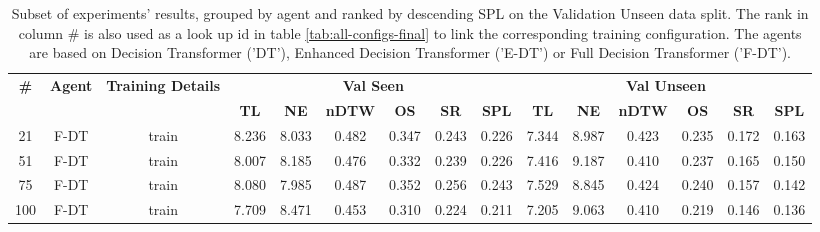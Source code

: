 \begin{table}
\centering
\caption{\label{tab:instruction_encoding_full}Subset of experiments' results, grouped by agent and ranked by descending SPL on the Validation Unseen data split. The rank in column \# is also used as a look up id in table \ref{tab:all-configs-final} to link the corresponding training configuration.     \newline The agents are based on Decision Transformer ('DT'), Enhanced Decision Transformer ('E-DT') or Full Decision Transformer ('F-DT').}
\begin{tabular}{@{\hskip3pt}c@{\hskip3pt}c@{\hskip3pt}c@{\hskip3pt}c@{\hskip3pt}c@{\hskip3pt}c@{\hskip3pt}c@{\hskip3pt}c@{\hskip3pt}c@{\hskip3pt}c@{\hskip3pt}c@{\hskip3pt}c@{\hskip3pt}c@{\hskip3pt}c@{\hskip3pt}c}
\toprule
\textbf{\#} & \textbf{Agent} & \textbf{Training Details} & \multicolumn{6}{c}{\textbf{Val Seen}} & \multicolumn{6}{c}{\textbf{Val Unseen}} \\
\cmidrule(l){4-9} \cmidrule(l){10-15} \textbf{~} &     \textbf{~} &                \textbf{~} &       \textbf{TL} & \textbf{NE} & \textbf{nDTW} & \textbf{OS} & \textbf{SR} & \textbf{SPL} &         \textbf{TL} & \textbf{NE} & \textbf{nDTW} & \textbf{OS} & \textbf{SR} & \textbf{SPL} \\
\midrule
         21 &           F-DT &                     train &             8.236 &       8.033 &         0.482 &       0.347 &       0.243 &        0.226 &               7.344 &       8.987 &         0.423 &       0.235 &       0.172 &        0.163 \\
         51 &           F-DT &                     train &             8.007 &       8.185 &         0.476 &       0.332 &       0.239 &        0.226 &               7.416 &       9.187 &         0.410 &       0.237 &       0.165 &        0.150 \\
         75 &           F-DT &                     train &             8.080 &       7.985 &         0.487 &       0.352 &       0.256 &        0.243 &               7.529 &       8.845 &         0.424 &       0.240 &       0.157 &        0.142 \\
        100 &           F-DT &                     train &             7.709 &       8.471 &         0.453 &       0.310 &       0.224 &        0.211 &               7.205 &       9.063 &         0.410 &       0.219 &       0.146 &        0.136 \\
\bottomrule
\end{tabular}
\end{table}
